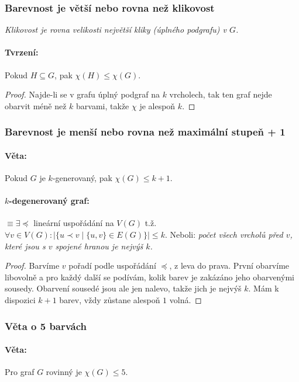\documentclass[10pt,a4paper]{article}
\begin{document}
\subsubsection{Barevnost je větší nebo rovna než klikovost}
\textit{Klikovost je rovna velikosti největší kliky (úplného podgrafu) v $G$.}

\paragraph*{Tvrzení:} Pokud $H\subseteq G$, pak $\chi (H) \leq \chi (G)$.

\begin{proof}
    Najde-li se v grafu úplný podgraf na $k$ vrcholech, tak ten graf nejde obarvit méně než $k$ barvami, takže $\chi$ je alespoň $k$.
\end{proof}

\subsubsection{Barevnost je menší nebo rovna než maximální stupeň + 1}
\paragraph*{Věta: } Pokud $G$ je $k$-generovaný, pak $\chi (G) \leq k+1$.

\paragraph*{$k$-degenerovaný graf:} $\equiv \exists \preceq$ lineární uspořádání na $V(G)$ t.ž. $\forall v \in V(G): |\{u \prec v \mid \{u,v\} \in E(G) \}| \leq k$.
 Neboli: \textit{počet všech vrcholů před $v$, které jsou s $v$ spojené hranou je nejvýš $k$.} 
\begin{proof}
    Barvíme $v$ pořadí podle uspořádání $\preceq$, z leva do prava. První obarvíme libovolně a pro každý další se podívám, kolik barev je zakázáno jeho obarvenými sousedy. Obarvení sousedé jsou ale jen nalevo, takže jich je nejvýš $k$. Mám k dispozici $k+1$ barev, vždy zůstane alespoň $1$ volná.
\end{proof}

\subsubsection{Věta o 5 barvách}
\paragraph*{Věta: } Pro graf $G$ rovinný je $\chi (G) \leq 5$.
\end{document}
